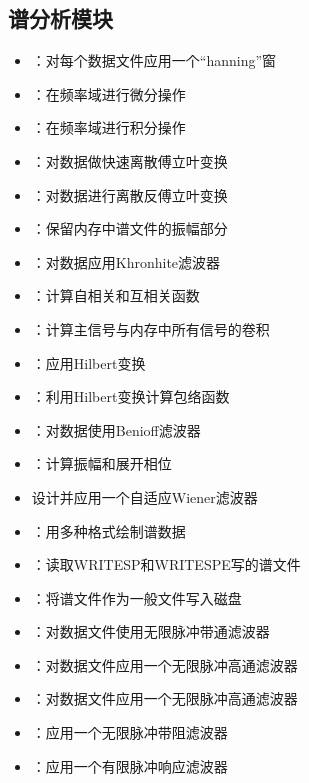 \subsection*{谱分析模块}
\begin{itemize}
\item {}：对每个数据文件应用一个``hanning''窗
\item {}：在频率域进行微分操作
\item {}：在频率域进行积分操作
\item {}：对数据做快速离散傅立叶变换
\item {}：对数据进行离散反傅立叶变换
\item {}：保留内存中谱文件的振幅部分
\item {}：对数据应用Khronhite滤波器
\item {}：计算自相关和互相关函数
\item {}：计算主信号与内存中所有信号的卷积
\item {}：应用Hilbert变换
\item {}：利用Hilbert变换计算包络函数
\item {}：对数据使用Benioff滤波器
\item {}：计算振幅和展开相位
\item {}设计并应用一个自适应Wiener滤波器
\item {}：用多种格式绘制谱数据
\item {}：读取WRITESP和WRITESPE写的谱文件
\item {}：将谱文件作为一般文件写入磁盘
\item {}：对数据文件使用无限脉冲带通滤波器
\item {}：对数据文件应用一个无限脉冲高通滤波器
\item {}：对数据文件应用一个无限脉冲高通滤波器
\item {}：应用一个无限脉冲带阻滤波器
\item {}：应用一个有限脉冲响应滤波器
\end{itemize}


